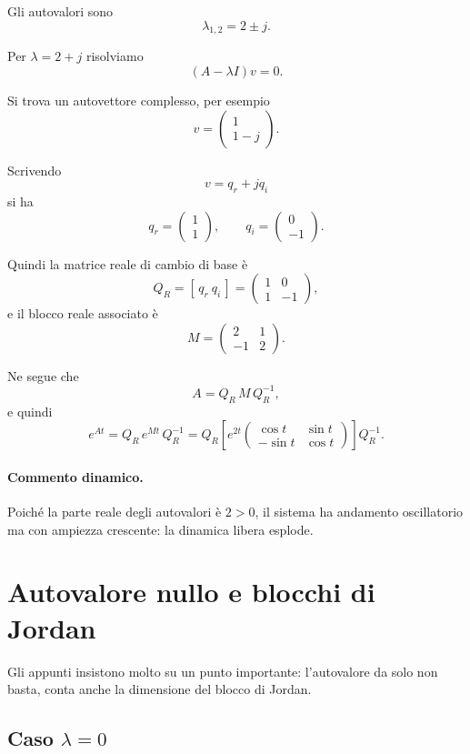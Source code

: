 Gli autovalori sono
\[
\lambda_{1,2}=2\pm j.
\]

Per $\lambda=2+j$ risolviamo
\[
(A-\lambda I)v=0.
\]

Si trova un autovettore complesso, per esempio
\[
v=
\begin{pmatrix}
1\\
1-j
\end{pmatrix}.
\]

Scrivendo
\[
v=q_r+jq_i
\]
si ha
\[
q_r=
\begin{pmatrix}
1\\
1
\end{pmatrix},
\qquad
q_i=
\begin{pmatrix}
0\\
-1
\end{pmatrix}.
\]

Quindi la matrice reale di cambio di base è
\[
Q_R=[\,q_r\ q_i\,]
=
\begin{pmatrix}
1 & 0\\
1 & -1
\end{pmatrix},
\]
e il blocco reale associato è
\[
M=
\begin{pmatrix}
2 & 1\\
-1 & 2
\end{pmatrix}.
\]

Ne segue che
\[
A=Q_R\,M\,Q_R^{-1},
\]
e quindi
\[
e^{At}=Q_R\,e^{Mt}\,Q_R^{-1}
=
Q_R\left[
e^{2t}
\begin{pmatrix}
\cos t & \sin t\\
-\sin t & \cos t
\end{pmatrix}
\right]Q_R^{-1}.
\]

\paragraph{Commento dinamico.}
Poiché la parte reale degli autovalori è $2>0$, il sistema ha andamento oscillatorio ma con ampiezza crescente: la dinamica libera esplode.

\section{Autovalore nullo e blocchi di Jordan}

Gli appunti insistono molto su un punto importante: l'autovalore da solo non basta, conta anche la dimensione del blocco di Jordan.

\subsection{Caso \texorpdfstring{$\lambda=0$}{lambda=0}}

